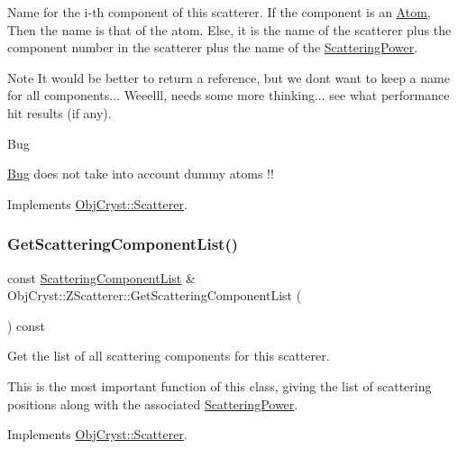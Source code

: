 Name for the i-\/th component of this scatterer. If the component is an \mbox{\hyperlink{class_obj_cryst_1_1_atom}{Atom}}, Then the name is that of the atom. Else, it is the name of the scatterer plus the component number in the scatterer plus the name of the \mbox{\hyperlink{class_obj_cryst_1_1_scattering_power}{Scattering\+Power}}. \begin{DoxyNote}{Note}
It would be better to return a reference, but we don\textquotesingle{}t want to keep a name for all components... Weeelll, needs some more thinking... see what performance hit results (if any).
\end{DoxyNote}
\begin{DoxyRefDesc}{Bug}
\item[\mbox{\hyperlink{bug__bug000001}{Bug}}]does not take into account dummy atoms !! \end{DoxyRefDesc}


Implements \mbox{\hyperlink{class_obj_cryst_1_1_scatterer_a42bdf508da6a90859a5a61e16c27d47e}{Obj\+Cryst\+::\+Scatterer}}.

\mbox{\label{class_obj_cryst_1_1_z_scatterer_afebe0638df5f8f8cd3db05f69ed41a21}} 
\subsubsection{\texorpdfstring{GetScatteringComponentList()}{GetScatteringComponentList()}}
{\footnotesize\ttfamily const \mbox{\hyperlink{class_obj_cryst_1_1_scattering_component_list}{Scattering\+Component\+List}} \& Obj\+Cryst\+::\+Z\+Scatterer\+::\+Get\+Scattering\+Component\+List (\begin{DoxyParamCaption}{ }\end{DoxyParamCaption}) const\hspace{0.3cm}{\ttfamily [virtual]}}



Get the list of all scattering components for this scatterer. 

This is the most important function of this class, giving the list of scattering positions along with the associated \mbox{\hyperlink{class_obj_cryst_1_1_scattering_power}{Scattering\+Power}}. 

Implements \mbox{\hyperlink{class_obj_cryst_1_1_scatterer_aca0e08e3793cc69d31fce53e481c2a67}{Obj\+Cryst\+::\+Scatterer}}.


